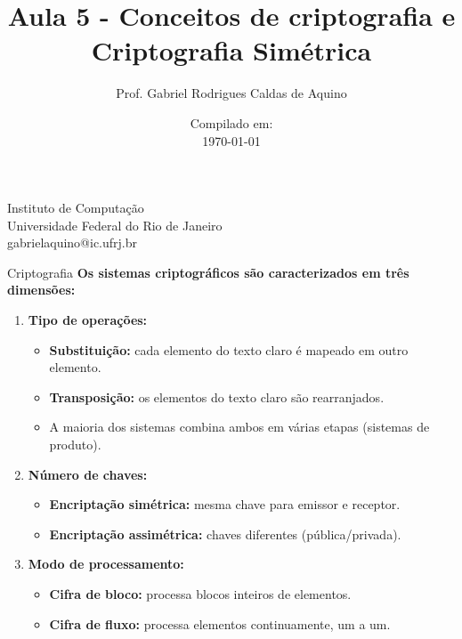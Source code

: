 \title{Aula 5 - Conceitos de criptografia e Criptografia Simétrica}

\author{Prof. Gabriel Rodrigues Caldas de Aquino}

\institute
{
    Instituto de Computação \\
    Universidade Federal do Rio de Janeiro\\
    gabrielaquino@ic.ufrj.br %
}
\date{Compilado em: \\ \today} %



\begin{frame}
    \titlepage
\end{frame}

\begin{frame}{Criptografia}
    \textbf{Os sistemas criptográficos são caracterizados em três dimensões:}

    \begin{enumerate}
        \item \textbf{Tipo de operações:}
              \begin{itemize}
                  \item \textbf{Substituição:} cada elemento do texto claro é mapeado em outro elemento.
                  \item \textbf{Transposição:} os elementos do texto claro são rearranjados.
                  \item A maioria dos sistemas combina ambos em várias etapas (sistemas de produto).
              \end{itemize}

        \item \textbf{Número de chaves:}
              \begin{itemize}
                  \item \textbf{Encriptação simétrica:} mesma chave para emissor e receptor.
                  \item \textbf{Encriptação assimétrica:} chaves diferentes (pública/privada).
              \end{itemize}

        \item \textbf{Modo de processamento:}
              \begin{itemize}
                  \item \textbf{Cifra de bloco:} processa blocos inteiros de elementos.
                  \item \textbf{Cifra de fluxo:} processa elementos continuamente, um a um.
              \end{itemize}
    \end{enumerate}
\end{frame}



